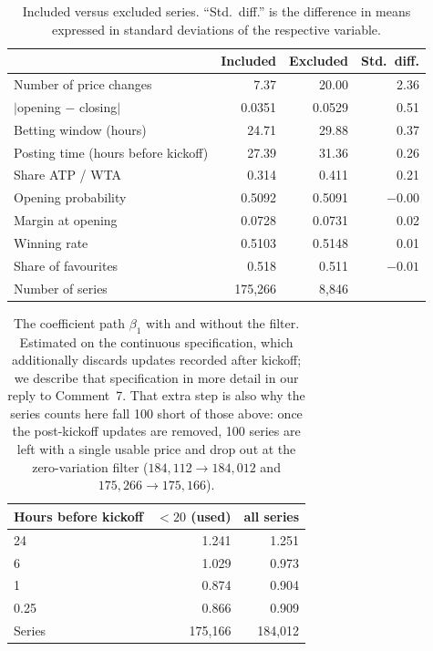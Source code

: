 \documentclass[letterpaper,12pt]{article}
\newcounter{b}
\begin{document}
\begin{enumerate}
{\begin{table}[H]
\centering
\caption{Included versus excluded series. ``Std.\ diff.'' is the difference in means expressed in standard deviations of the respective variable.}
\label{tab:r1c5}
\small
\begin{tabular}{lrrr}
\toprule
 & Included & Excluded & Std.\ diff. \\
\midrule
Number of price changes           & 7.37   & 20.00  & 2.36 \\
$|$opening $-$ closing$|$         & 0.0351 & 0.0529 & 0.51 \\
Betting window (hours)            & 24.71  & 29.88  & 0.37 \\
Posting time (hours before kickoff) & 27.39 & 31.36  & 0.26 \\
Share ATP / WTA                   & 0.314  & 0.411  & 0.21 \\
\midrule
Opening probability               & 0.5092 & 0.5091 & $-0.00$ \\
Margin at opening                 & 0.0728 & 0.0731 & 0.02 \\
Winning rate                      & 0.5103 & 0.5148 & 0.01 \\
Share of favourites               & 0.518  & 0.511  & $-0.01$ \\
\midrule
Number of series                  & 175{,}266 & 8{,}846 & \\
\bottomrule
\end{tabular}
\end{table}

\begin{table}[H]
\centering
\caption{The coefficient path $\beta_1$ with and without the filter. Estimated on the continuous specification, which additionally discards updates recorded after kickoff; we describe that specification in more detail in our reply to Comment~7. That extra step is also why the series counts here fall 100 short of those above: once the post-kickoff updates are removed, 100 series are left with a single usable price and drop out at the zero-variation filter ($184{,}112 \to 184{,}012$ and $175{,}266 \to 175{,}166$).}
\label{tab:r1c5b}
\small
\begin{tabular}{lrr}
\toprule
Hours before kickoff & $< 20$ (used) & all series \\
\midrule
24    & 1.241 & 1.251 \\
6     & 1.029 & 0.973 \\
1     & 0.874 & 0.904 \\
0.25  & 0.866 & 0.909 \\
\midrule
Series & 175{,}166 & 184{,}012 \\
\bottomrule
\end{tabular}
\end{table}
}


\end{enumerate}
\end{document}
